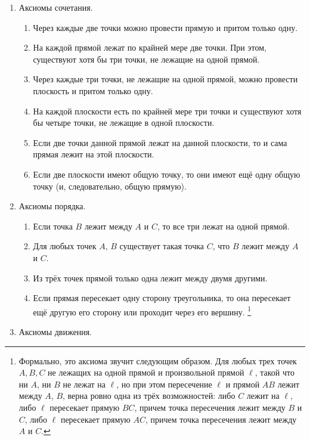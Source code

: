 \documentclass{article}
\begin{document}
\begin{enumerate}[label=\Roman*.] 
    \item Аксиомы сочетания. 
    \begin{enumerate}[noitemsep, parsep=0pt, topsep=0pt]
        \item Через каждые две точки можно провести прямую и притом только одну. 
        \item На каждой прямой лежат по крайней мере две точки. При этом, существуют хотя бы три точки, не лежащие на одной прямой. 
        \item Через каждые три точки, не лежащие на одной прямой, можно провести плоскость и притом только одну. 
        \item На каждой плоскости есть по крайней мере три точки и существуют хотя бы четыре точки, не лежащие в одной плоскости. 
        \item Если две точки данной прямой лежат на данной плоскости, то и сама прямая лежит на этой плоскости. 
        \item Если две плоскости имеют общую точку, то они имеют ещё одну общую точку (и, следовательно, общую прямую).
    \end{enumerate}
    \item Аксиомы порядка.
    \begin{enumerate}[noitemsep, parsep=0pt, topsep=0pt] 
        \item Если точка $B$ лежит между $A$ и $C$, то все три лежат на одной прямой. 
        \item Для любых точек $A$, $B$ существует такая точка $C$, что $B$ лежит между $A$ и $C$. 
        \item Из трёх точек прямой только одна лежит между двумя другими. 
        \item Если прямая пересекает одну сторону треугольника, то она пересекает ещё другую его сторону или проходит через его вершину. \footnote{Формально, это аксиома звучит следующим образом. Для любых трех точек $A, B, C$ не лежащих на одной прямой и произвольной прямой $\ell$, такой что ни $A$, ни $B$ не лежат на $\ell$, но при этом пересечение $\ell$ и прямой $AB$ лежит между $A$, $B$, верна ровно одна из трёх возможностей: либо $C$ лежит на $\ell$, либо $\ell$ пересекает прямую $BC$, причем точка пересечения лежит между $B$ и $C$, либо $\ell$ пересекает прямую $AC$, причем точка пересечения лежит между $A$ и $C$.}
    \end{enumerate}
    \item Аксиомы движения. 
    \begin{enumerate}[noitemsep, parsep=0pt, topsep=0pt] 

\end{enumerate}
\end{enumerate}
\end{document}
